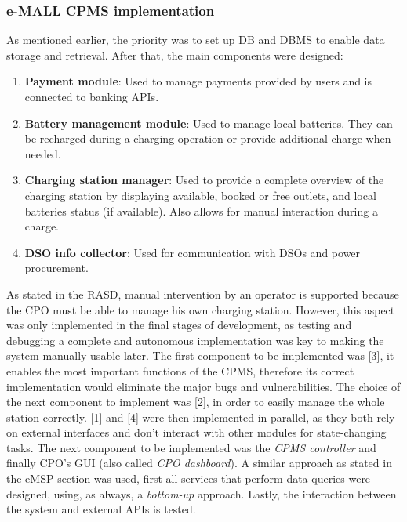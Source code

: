 \documentclass[12pt]{report}
\begin{document}
\bigskip
\subsubsection{e-MALL CPMS implementation}
As mentioned earlier, the priority was to set up DB and DBMS to enable data storage and retrieval. After that, the main components were designed:
\begin{enumerate}
    \item\textbf{Payment module}: Used to manage payments provided by users and is connected to banking APIs.
    \item\textbf{Battery management module}: Used to manage local batteries. They can be recharged during a charging operation or provide additional charge when needed.
    \item\textbf{Charging station manager}: Used to provide a complete overview of the charging station by displaying available, booked or free outlets, and local batteries status (if available). Also allows for manual interaction during a charge.
    \item\textbf{DSO info collector}: Used for communication with DSOs and power procurement.
\end{enumerate}

\noindent As stated in the RASD, manual intervention by an operator is supported because the CPO must be able to manage his own charging station. However, this aspect was only implemented in the final stages of development, as testing and debugging a complete and autonomous implementation was key to making the system manually usable later.\newline
The first component to be implemented was [3], it enables the most important functions of the CPMS, therefore its correct implementation would eliminate the major bugs and vulnerabilities. The choice of the next component to implement was [2], in order to easily manage the whole station correctly. [1] and [4] were then implemented in parallel, as they both rely on external interfaces and don't interact with other modules for state-changing tasks.\newline
The next component to be implemented was the \emph{CPMS controller} and finally CPO's GUI (also called \emph{CPO dashboard}).\newline
A similar approach as stated in the eMSP section was used, first all services that perform data queries were designed, using, as always, a \emph{bottom-up} approach.\newline
Lastly, the interaction between the system and external APIs is tested.
\end{document}
